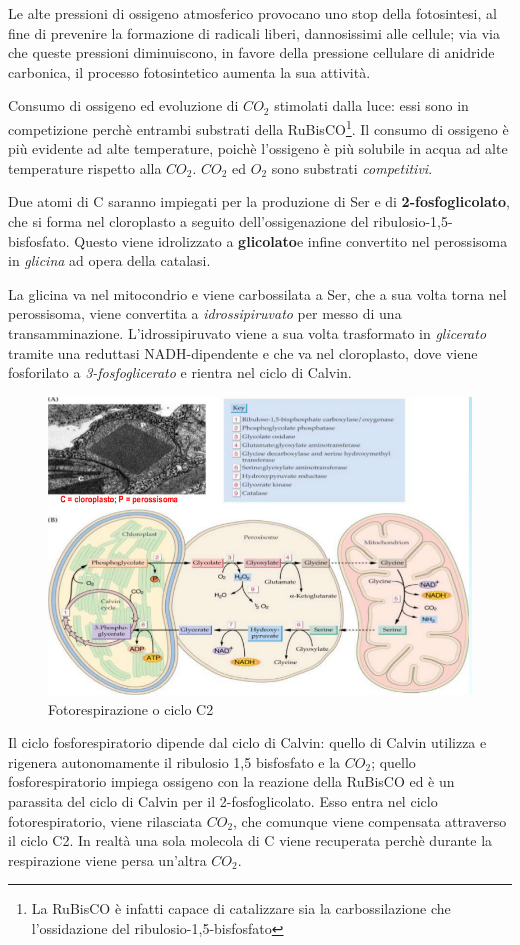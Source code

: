 \documentclass[a4paper,12pt]{book}
\begin{document}
Le alte pressioni di ossigeno atmosferico provocano uno stop della fotosintesi, al fine di prevenire la formazione di radicali liberi, dannosissimi alle cellule; via via che queste pressioni diminuiscono, in favore della pressione cellulare di anidride carbonica, il processo fotosintetico aumenta la sua attività.

Consumo di ossigeno ed evoluzione di $CO_{2}$ stimolati dalla luce: essi sono in competizione perchè entrambi substrati della RuBisCO\footnote{La RuBisCO è infatti capace di catalizzare sia la carbossilazione che l'ossidazione del ribulosio-1,5-bisfosfato}. Il consumo di ossigeno è più evidente ad alte temperature, poichè l'ossigeno è più solubile in acqua ad alte temperature rispetto alla $CO_{2}$. $CO_{2}$ ed $O_{2}$ sono substrati \emph{competitivi}.

Due atomi di C saranno impiegati per la produzione di Ser e di \textbf{2-fosfoglicolato}, che si forma nel cloroplasto a seguito dell'ossigenazione del ribulosio-1,5-bisfosfato. Questo viene idrolizzato a \textbf{glicolato}e infine convertito nel perossisoma in \emph{glicina} ad opera della catalasi.

La glicina va nel mitocondrio e viene carbossilata a Ser, che a sua volta torna nel perossisoma, viene convertita a \emph{idrossipiruvato} per messo di una transamminazione. L'idrossipiruvato viene a sua volta trasformato in  \emph{glicerato} tramite una reduttasi NADH-dipendente e che va nel cloroplasto, dove viene fosforilato a \emph{3-fosfoglicerato} e rientra nel ciclo di Calvin.
\begin{figure}[H]
\centering
\includegraphics[scale=0.4]{immagini/c2.jpg}
\caption{Fotorespirazione o ciclo C2}
\end{figure}
Il ciclo fosforespiratorio dipende dal ciclo di Calvin: quello di Calvin utilizza e rigenera autonomamente il ribulosio 1,5 bisfosfato e la $CO_{2}$; quello fosforespiratorio impiega ossigeno con la reazione della RuBisCO ed è un parassita del ciclo di Calvin per il 2-fosfoglicolato. Esso entra nel ciclo fotorespiratorio, viene rilasciata $CO_{2}$, che comunque viene compensata attraverso il ciclo C2. In realtà una sola molecola di C viene recuperata perchè durante la respirazione viene persa un'altra $CO_{2}$. 
\end{document}
